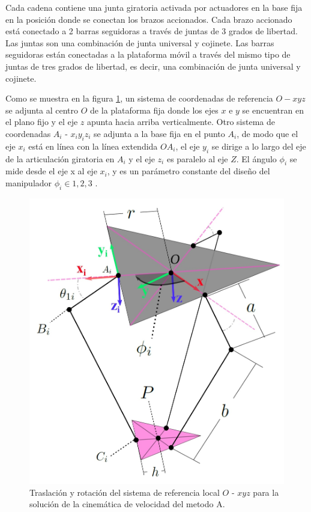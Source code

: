        \newpage
        
     Cada cadena contiene una junta giratoria activada por actuadores en la base fija en la posición donde se conectan los brazos accionados. Cada brazo accionado está conectado a 2 barras seguidoras a través de juntas de 3 grados de libertad. Las juntas son una combinación de junta universal y cojinete.  Las barras seguidoras están conectadas a la plataforma móvil a través del mismo tipo de juntas de tres grados de libertad, es decir, una combinación de junta universal y cojinete.

      

        Como se muestra en la figura \ref{f:Cap4_Metodo_A_Modelacion_Cinematica_Posicion_71}, un sistema de coordenadas de referencia $O-xyz$ se adjunta al centro $O$ de la plataforma fija donde los ejes $x$ e $y$ se encuentran en el plano fijo y el eje $z$ apunta hacia arriba verticalmente.
        Otro sistema de coordenadas $A_i$ -  $x_iy_iz_i$  se adjunta a la base fija en el punto $A_i$, de modo que el eje $x_i$ está en línea con la línea extendida $OA_i$, el eje $y_i$ se dirige a lo largo del eje de la articulación giratoria en $A_i$ y el eje $z_i$ es paralelo al eje $Z$. 
        El ángulo $\phi_i$ se mide desde el eje x al eje $x_i$, y es un parámetro constante del diseño del manipulador $\phi_i ∈{1,2,3}$ .  
    
    


        \begin{figure}[htb]
             \centering
             \includegraphics[width=0.8\linewidth]{Main/Chapter4/Images4/DIBUJO19.jpg}
              \caption{Traslación y rotación del sistema de referencia local $O$ - $xyz$ para la solución de la cinemática de velocidad del metodo A. }
              \label{f:Cap4_Metodo_A_Modelacion_Cinematica_Posicion_71}
        \end{figure}
        
